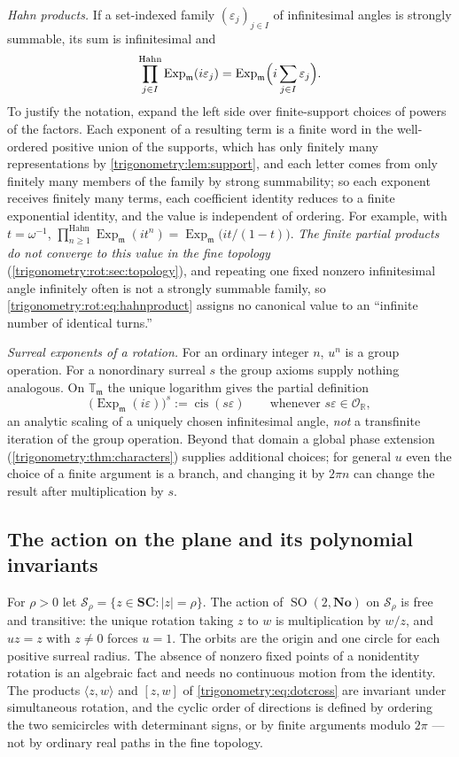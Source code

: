 \documentclass[11pt,letterpaper]{article}
\numberwithin{equation}{section}
\theoremstyle{definition}
\theoremstyle{remark}
\newcommand{\No}{\mathbf{No}}
\newcommand{\SC}{\mathbf{SC}}
\newcommand{\R}{\mathbb R}
\newcommand{\OO}{\mathcal O}
\newcommand{\mm}{\mathfrak m}
\newcommand{\TT}{\mathbb T}
\newcommand{\eps}{\varepsilon}
\newcommand{\cis}{\operatorname{cis}}
\newcommand{\Ex}{\operatorname{Exp}_{\mm}}
\newcommand{\SO}{\operatorname{SO}}
\newcommand{\Tm}{\TT_{\mm}}
\begin{document}
\emph{Hahn products.} If a set-indexed family $(\eps_j)_{j\in I}$ of infinitesimal angles is
strongly summable, its sum is infinitesimal and
\begin{equation}\label{trigonometry:rot:eq:hahnproduct}
 \prod_{j\in I}^{\mathrm{Hahn}}\Ex(i\eps_j)=\Ex\Bigl(i\sum_{j\in I}\eps_j\Bigr).
\end{equation}
To justify the notation, expand the left side over finite-support choices of powers of the factors.
Each exponent of a resulting term is a finite word in the well-ordered positive union of the
supports, which has only finitely many representations by \cref{trigonometry:lem:support}, and each
letter comes from only finitely many members of the family by strong summability; so each exponent
receives finitely many terms, each coefficient identity reduces to a finite exponential identity, and
the value is independent of ordering. For example, with $t=\omega^{-1}$,
$\prod_{n\ge1}^{\mathrm{Hahn}}\Ex(it^n)=\Ex\bigl(it/(1-t)\bigr)$. \emph{The finite partial products
do not converge to this value in the fine topology} (\cref{trigonometry:rot:sec:topology}), and
repeating one fixed nonzero infinitesimal angle infinitely often is not a strongly summable family,
so \cref{trigonometry:rot:eq:hahnproduct} assigns no canonical value to an ``infinite number of
identical turns.''

\emph{Surreal exponents of a rotation.} For an ordinary integer $n$, $u^n$ is a group operation. For
a nonordinary surreal $s$ the group axioms supply nothing analogous. On $\Tm$ the unique logarithm
gives the partial definition
\begin{equation}\label{trigonometry:rot:eq:surrealpower}
 \bigl(\Ex(i\eps)\bigr)^s:=\cis(s\eps)\qquad\text{whenever }s\eps\in\OO_{\R},
\end{equation}
an analytic scaling of a uniquely chosen infinitesimal angle, \emph{not} a transfinite iteration of
the group operation. Beyond that domain a global phase extension (\cref{trigonometry:thm:characters})
supplies additional choices; for general $u$ even the choice of a finite argument is a branch, and
changing it by $2\pi n$ can change the result after multiplication by $s$.

\subsection{The action on the plane and its polynomial invariants}\label{trigonometry:rot:sec:action}
For $\rho>0$ let $\mathcal S_\rho=\{z\in\SC:|z|=\rho\}$. The action of $\SO(2,\No)$ on
$\mathcal S_\rho$ is free and transitive: the unique rotation taking $z$ to $w$ is multiplication by
$w/z$, and $uz=z$ with $z\ne0$ forces $u=1$. The orbits are the origin and one circle for each
positive surreal radius. The absence of nonzero fixed points of a nonidentity rotation is an
algebraic fact and needs no continuous motion from the identity. The products $\langle z,w\rangle$
and $[z,w]$ of \cref{trigonometry:eq:dotcross} are invariant under simultaneous rotation, and the
cyclic order of directions is defined by ordering the two semicircles with determinant signs, or by
finite arguments modulo $2\pi$ --- not by ordinary real paths in the fine topology.
\end{document}
